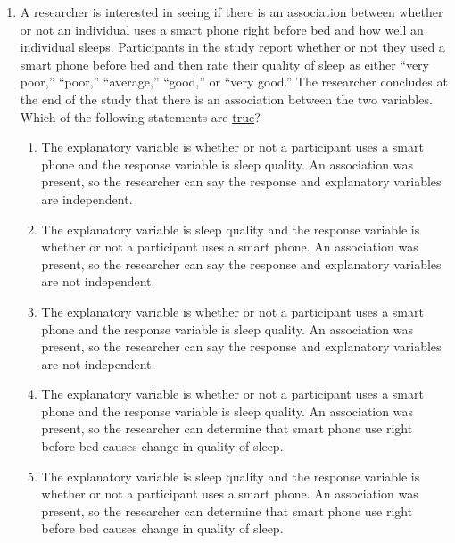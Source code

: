 \documentclass[11pt,fullpage]{amsart}
\begin{document}
\begin{enumerate}
\item
A researcher is interested in seeing if there is an association between whether or not an individual uses a smart phone right before bed and how well an individual sleeps.  Participants in the study report whether or not they used a smart phone before bed and then rate their quality of sleep as either ``very poor,'' ``poor,'' ``average,'' ``good,'' or ``very good.''  The researcher concludes at the end of the study that there is an association between the two variables. Which of the following statements are \underline{true}?
\begin{enumerate}
\item	The explanatory variable is whether or not a participant uses a smart phone and the response variable is sleep quality.  An association was present, so the researcher can say the response and explanatory variables are independent.
\item	The explanatory variable is sleep quality and the response variable is whether or not a participant uses a smart phone.  An association was present, so the researcher can say the response and explanatory variables are not independent.
\item	The explanatory variable is whether or not a participant uses a smart phone and the response variable is sleep quality.  An association was present, so the researcher can say the response and explanatory variables are not independent.
\item	The explanatory variable is whether or not a participant uses a smart phone and the response variable is sleep quality.  An association was present, so the researcher can determine that smart phone use right before bed causes change in quality of sleep.
\item	The explanatory variable is sleep quality and the response variable is whether or not a participant uses a smart phone.  An association was present, so the researcher can determine that smart phone use right before bed causes change in quality of sleep.
\end{enumerate}

\vfill


\end{enumerate}
\end{document}
